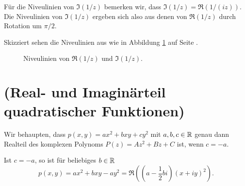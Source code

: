 \documentclass[a4paper,10pt]{article}
\begin{document}
Für die Niveulinien von $\Im(1/z)$ bemerken wir, dass $\Im(1/z) = \Re(1/(iz))$. Die Niveulinien von $\Im(1/z)$ ergeben sich also aus denen von $\Re(1/z)$ durch Rotation um $\pi/2$.

Skizziert sehen die Niveulinien aus wie in Abbildung \ref{fig: Niveulinien von 1/z} auf Seite \pageref{fig: Niveulinien von 1/z}.

\begin{figure}\centering
 \newcommand{\samplerate}{0}
 \caption{Niveulinien von $\Re(1/z)$ und $\Im(1/z)$.}
 \label{fig: Niveulinien von 1/z}
\end{figure}















\section{(Real- und Imaginärteil quadratischer Funktionen)}
Wir behaupten, dass $p(x,y) = ax^2 + bxy + cy^2$ mit $a,b,c \in \mathbb{R}$ genau dann Realteil des komplexen Polynoms $P(z) = Az^2 + Bz + C$ ist, wenn $c = -a$.

Ist $c = -a$, so ist für beliebiges $b \in \mathbb{R}$
\[
 p(x,y) = ax^2 + bxy - ay^2 = \Re\left(\left(a-\frac{1}{2}bi\right)(x+iy)^2\right).
\]
\end{document}

